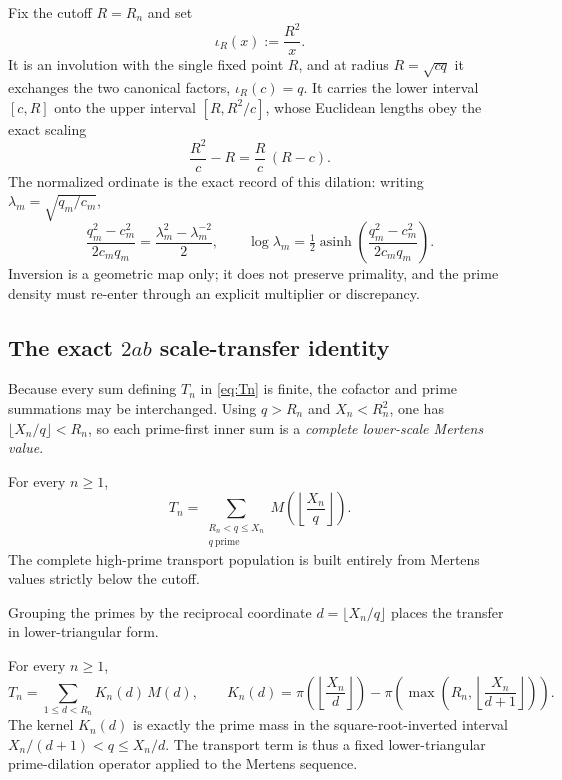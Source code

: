 Fix the cutoff $R=R_n$ and set
\begin{equation}
 \iota_R(x):=\frac{R^2}{x}.
 \label{eq:sqrt-inversion}
\end{equation}
It is an involution with the single fixed point $R$, and at radius $R=\sqrt{cq}$ it exchanges the two canonical factors, $\iota_R(c)=q$.  It carries the lower interval $[c,R]$ onto the upper interval $[R,R^2/c]$, whose Euclidean lengths obey the exact scaling
\begin{equation}
 \frac{R^2}{c}-R=\frac Rc\,(R-c).
 \label{eq:inversion-length}
\end{equation}
The normalized ordinate is the exact record of this dilation: writing $\lambda_m=\sqrt{q_m/c_m}$,
\begin{equation}
 \frac{q_m^2-c_m^2}{2c_mq_m}
 =\frac{\lambda_m^2-\lambda_m^{-2}}2,
 \qquad
 \log\lambda_m=\tfrac12\operatorname{asinh}\!\left(\frac{q_m^2-c_m^2}{2c_mq_m}\right).
 \label{eq:twoab-dilation}
\end{equation}
Inversion is a geometric map only; it does not preserve primality, and the prime density must re-enter through an explicit multiplier or discrepancy.

\subsection{The exact $2ab$ scale-transfer identity}

Because every sum defining $T_n$ in \cref{eq:Tn} is finite, the cofactor and prime summations may be interchanged.  Using $q>R_n$ and $X_n<R_n^2$, one has $\lfloor X_n/q\rfloor<R_n$, so each prime-first inner sum is a \emph{complete lower-scale Mertens value}.

\begin{theorem}
\label{thm:transport-primefirst}
For every $n\ge1$,
\begin{equation}
 \boxed{
 T_n
 =\sum_{\substack{R_n<q\le X_n\\ q\ \mathrm{prime}}}
 M\!\left(\left\lfloor\frac{X_n}{q}\right\rfloor\right).
 }
 \label{eq:transport-primefirst}
\end{equation}
The complete high-prime transport population is built entirely from Mertens values strictly below the cutoff.
\end{theorem}

Grouping the primes by the reciprocal coordinate $d=\lfloor X_n/q\rfloor$ places the transfer in lower-triangular form.

\begin{theorem}
\label{thm:prime-dilation}
For every $n\ge1$,
\begin{equation}
 \boxed{
 T_n=\sum_{1\le d<R_n}K_n(d)\,M(d),
 \qquad
 K_n(d)=\pi\!\left(\left\lfloor\frac{X_n}{d}\right\rfloor\right)
 -\pi\!\left(\max\!\left(R_n,\left\lfloor\frac{X_n}{d+1}\right\rfloor\right)\right).
 }
 \label{eq:prime-dilation}
\end{equation}
The kernel $K_n(d)$ is exactly the prime mass in the square-root-inverted interval $X_n/(d+1)<q\le X_n/d$.  The transport term is thus a fixed lower-triangular prime-dilation operator applied to the Mertens sequence.
\end{theorem}

